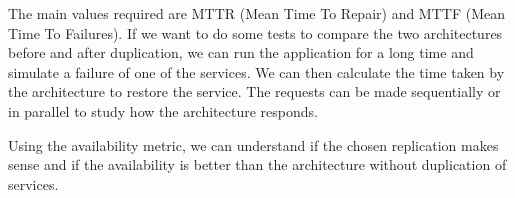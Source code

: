 \highspace
The main values required are MTTR (Mean Time To Repair) and MTTF (Mean Time To Failures). If we want to do some tests to compare the two architectures before and after duplication, we can run the application for a long time and simulate a failure of one of the services. We can then calculate the time taken by the architecture to restore the service. The requests can be made sequentially or in parallel to study how the architecture responds.

\highspace
Using the availability metric, we can understand if the chosen replication makes sense and if the availability is better than the architecture without duplication of services.
